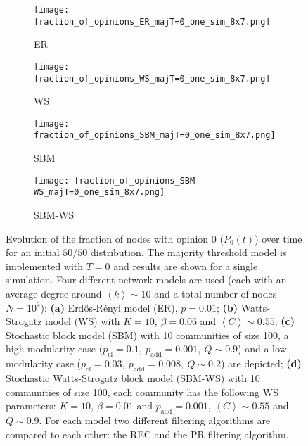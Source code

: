 \documentclass[11 pt , letterpaper , twoside , openright]{book}
\begin{document}

\begin{figure}[H]
  \begin{subfigure}[b]{0.49\textwidth}
  	\texttt{[image: fraction\_of\_opinions\_ER\_majT=0\_one\_sim\_8x7.png]}
    \caption{ER}
    \label{er_majT}
  \end{subfigure}
  \begin{subfigure}[b]{0.49\textwidth}
  	\texttt{[image: fraction\_of\_opinions\_WS\_majT=0\_one\_sim\_8x7.png]}
    \caption{WS}
    \label{ws_majT}
  \end{subfigure}
  \begin{subfigure}[b]{0.49\textwidth}
    \texttt{[image: fraction\_of\_opinions\_SBM\_majT=0\_one\_sim\_8x7.png]}
    \caption{SBM}
    \label{sbm_majT}
  \end{subfigure}
  \begin{subfigure}[b]{0.49\textwidth}
    \texttt{[image: fraction\_of\_opinions\_SBM-WS\_majT=0\_one\_sim\_8x7.png]}
    \caption{SBM-WS}
    \label{sbm-ws_majT}
  \end{subfigure}
  \captionsetup{format=plain}
  \caption[Evolution of the fraction of nodes with opinion 0 ($P_0(t)$) over time for an initial $50/50$ opinion distribution. Results for one simulation of the majority threshold model with $T=0$ ]{Evolution of the fraction of nodes with opinion 0 ($P_0(t)$) over time for an initial $50/50$ distribution. The majority threshold model is implemented with $T=0$ and results are shown for a single simulation. Four different network models are used (each with an average degree around $\left<k\right> \sim 10$ and a total number of nodes $N = 10^3$): \textbf{(a)} Erd\H{o}s-R\'{e}nyi model (ER), $p=0.01$; \textbf{(b)} Watts-Strogatz model (WS) with $K = 10$, $\beta = 0.06$ and $\left<C\right> \sim 0.55$; \textbf{(c)} Stochastic block model (SBM) with 10 communities of size 100, a high modularity case ($p_{\text{cl}} = 0.1,\ p_{\text{add}} = 0.001,\ Q \sim 0.9$) and a low modularity case ($p_{\text{cl}} = 0.03,\ p_{\text{add}} = 0.008,\ Q \sim 0.2$) are depicted; \textbf{(d)} Stochastic Watts-Strogatz block model (SBM-WS) with 10 communities of size 100, each community has the following WS parameters: $K = 10,\ \beta = 0.01$ and $p_{\text{add}} = 0.001$, $\left<C\right> \sim 0.55$ and $Q \sim 0.9$. For each model two different filtering algorithms are compared to each other: the REC and the PR filtering algorithm.}
\label{ev_op_majT_one_sim}
\end{figure}
\end{document}
